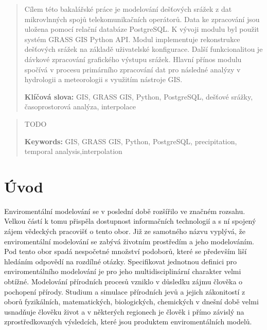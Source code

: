 \documentclass[a4paper,12pt]{article}
\author{Matěj Krejčí}
\newcommand{\klicslova}[2]{\noindent\textbf{#1: }#2}
\newcommand{\necislovana}[1]{%
\phantomsection
\addcontentsline{toc}{section}{#1}
\section*{#1}
\markboth{\uppercase{#1}}{}
}
\begin{document}
\pagestyle{empty}
\renewcommand\footnotelayout{\footnotesize}

\newpage


\begin{abstract}
Cílem této bakalářské práce je modelování dešťových srážek z dat mikrovlnných spojů telekomunikačních operátorů. Data ke zpracování jsou uložena pomocí relační databáze PostgreSQL.
K vývoji modulu byl použit systém GRASS GIS Python API. Modul implementuje rekonstrukce dešťových srážek na základě uživatelské konfigurace. Další funkcionalitou je dávkové zpracování grafického výstupu srážek. Hlavní přínos modulu spočívá v procesu primárního zpracování dat pro následné analýzy v hydrologii a meteorologii s využitím nástroje GIS.
\bigskip

\klicslova{Klíčová slova}{GIS, GRASS GIS, Python, PostgreSQL, dešťové srážky, časoprostorová analýza, interpolace}

\end{abstract}

\begin{abstract}
TODO 
\bigskip

\klicslova{Keywords}{GIS, GRASS GIS, Python, PostgreSQL, precipitation, temporal analysis,interpolation}

\end{abstract}


\newpage

\newpage
\tableofcontents


\newpage
\pagestyle{fancy}

\necislovana{Úvod}

Enviromentální modelování se v poslední době rozšířilo ve značném rozsahu. Velkou částí k tomu přispěla dostupnost informačních technologií a s ní spojený zájem vědeckých pracovišť o tento obor. Již ze samotného názvu vyplývá, že enviromentální modelování se zabývá životním prostředím a jeho modelováním. Pod tento obor spadá nespočetné množství podoborů, které se především liší hledáním odpovědí na rozdílné otázky. Specifikovat jednotnou definici pro enviromentálního modelování je pro jeho multidisciplinární charakter velmi obtížné. Modelování přírodních procesů vzniklo v důsledku zájmu člověka o pochopení přírody. Studium a simulace přírodních jevů a jejich zákonitostí z oborů fyzikálních, matematických, biologických, chemických v dnešní době velmi usnadňuje člověku život a v některých regionech je člověk i přímo závislý na zprostředkovaných výsledcích, které jsou produktem enviromentálních modelů. 
\end{document}
